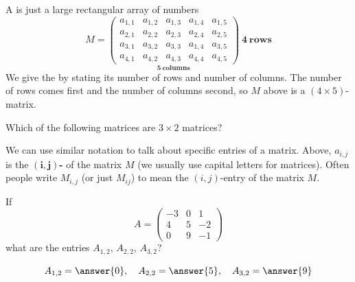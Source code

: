 \documentclass{ximera}
\begin{document}
A  is just a large rectangular array of numbers
\[
M =
\underset{\displaystyle\boldsymbol{5}~\textbf{columns}}{\begin{pmatrix}
  a_{1,1} & a_{1,2} & a_{1,3} & a_{1,4} & a_{1,5} \\
  a_{2,1} & a_{2,2} & a_{2,3} & a_{2,4} & a_{2,5} \\
  a_{3,1} & a_{3,2} & a_{3,3} & a_{1,4} & a_{3,5} \\
  a_{4,1} & a_{4,2} & a_{4,3} & a_{4,4} & a_{4,5}
\end{pmatrix}}
~\boldsymbol{4}~\textbf {rows}
\]
We give the  by stating its number of rows
and number of columns. The number of rows comes first and the number
of columns second, so $M$ above is a $(4\times 5)$-matrix.
\begin{question}
  Which of the following matrices are $3\times 2$ matrices?
  \begin{selectAll}
  \pdfOnly{\end{multicols}}
  \end{selectAll}
\end{question}


We can use similar notation to talk about specific entries of a
matrix. Above, $a_{i,j}$ is the $\boldsymbol{(i,j)}${\bf-}
of the matrix $M$ (we usually use capital letters for matrices). Often
people write $M_{i,j}$ (or just $M_{ij}$) to mean the $(i,j)$-entry of
the matrix $M$.



\begin{question}
  If
  \[A= \begin{pmatrix}
  -3 & 0 & 1\\
  4 & 5 & -2\\
  0 & 9 & -1
  \end{pmatrix}
  \]
  what are the entries $A_{1,2}$, $A_{2,2}$, $A_{3,2}$?
  \begin{prompt}
    \[
    A_{1,2} = \answer{0}, \quad A_{2,2} = \answer{5}, \quad A_{3,2} = \answer{9}
    \]
  \end{prompt}
\end{question}
\end{document}
